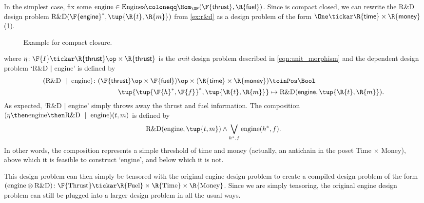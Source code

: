 \begin{example}\label{ex:r&dproblem}
In the simplest case, fix some $\text{engine} \in \text{Engines} \coloneqq \Hom_\DP(\F{\mathsf{thrust}},\R{\mathsf{fuel}})$. Since \DP is compact closed, we can rewrite the R\&D design problem $\text{R\&D}(\F{\mathsf{engine}}^*, \tup{\R{t},\R{m}})$ from \cref{ex:r&d} as a design problem of the form $\One \tickar \R{\mathsf{time}} \times\R{\mathsf{money}}$ (\cref{fig:excompactclosed}).

\begin{figure}[h!]
\begin{center}
\end{center}
\caption{Example for compact closure. \label{fig:excompactclosed}}
\end{figure}
where $\eta \colon \F{I} \tickar \R{\mathsf{thrust}}\op \times \R{\mathsf{thrust}}$ is the \emph{unit} design problem described in \cref{eqn:unit_morphism} and the dependent design problem `R\&D $\mid$ engine' is defined by
\begin{equation}
\begin{aligned}
(\text{R\&D } \mid \text{ engine}) \colon (\F{\mathsf{thrust}}\op \times \F{\mathsf{fuel}})\op \times (\R{\mathsf{time}} \times \R{\mathsf{money}}) &\toinPos \Bool \\
\tup{\tup{\F{h}^*, \F{f}}^*, \tup{\R{t},\R{m}}} &\mapsto \text{R\&D}(\mathsf{engine}, \tup{\R{t},\R{m}}).
\end{aligned}
\end{equation}
As expected, `R\&D $|$ engine' simply throws away the thrust and fuel information. The composition $(\eta \then \text{engine} \then \text{R\&D } \mid \text{ engine}) (t,m)$ is defined by
\begin{equation}
    \text{R\&D}(\text{engine}, \tup{t,m}) \wedge \bigvee_{h^*,f} \text{engine}(h^*, f).
\end{equation}
In other words, the composition represents a simple threshold of time and money (actually, an antichain in the poset Time $\times$ Money), above which it is feasible to construct `engine', and below which it is not.

This design problem can then simply be tensored with the original engine design problem to create a compiled design problem of the form $(\text{engine} \otimes \text{R\&D}) \colon \F{\text{Thrust}} \tickar \R{\text{Fuel}} \times \R{\text{Time}} \times \R{\text{Money}}$. Since we are simply tensoring, the original engine design problem can still be plugged into a larger design problem in all the usual ways.
\end{example}
